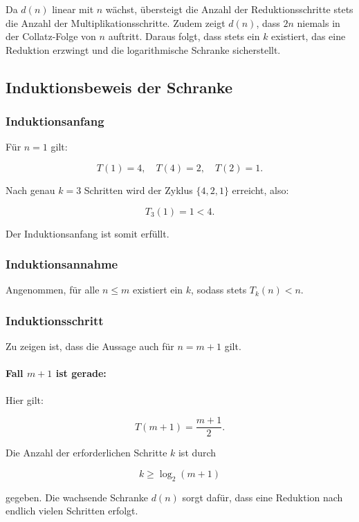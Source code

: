 \documentclass[a4paper,12pt]{article}
\begin{document}
Da \( d(n) \) linear mit \( n \) wächst, übersteigt die Anzahl der Reduktionsschritte stets die Anzahl der Multiplikationsschritte. Zudem zeigt \( d(n) \), dass \( 2n \) niemals in der Collatz-Folge von \( n \) auftritt. Daraus folgt, dass stets ein \( k \) existiert, das eine Reduktion erzwingt und die logarithmische Schranke sicherstellt.

\subsection{Induktionsbeweis der Schranke}

\subsubsection{Induktionsanfang}

Für \( n = 1 \) gilt:

\[
T(1) = 4, \quad T(4) = 2, \quad T(2) = 1.
\]

Nach genau \( k = 3 \) Schritten wird der Zyklus \( \{4, 2, 1\} \) erreicht, also:

\[
T_3(1) = 1 < 4.
\]

Der Induktionsanfang ist somit erfüllt.

\subsubsection{Induktionsannahme}

Angenommen, für alle \( n \leq m \) existiert ein \( k \), sodass stets \( T_k(n) < n \).

\subsubsection{Induktionsschritt}

Zu zeigen ist, dass die Aussage auch für \( n = m + 1 \) gilt.

\paragraph{Fall \( m + 1 \) ist gerade:}

Hier gilt:

\[
T(m + 1) = \frac{m + 1}{2}.
\]

Die Anzahl der erforderlichen Schritte \( k \) ist durch

\[
k \geq \log_2(m + 1)
\]

gegeben. Die wachsende Schranke \( d(n) \) sorgt dafür, dass eine Reduktion nach endlich vielen Schritten erfolgt.
\end{document}
